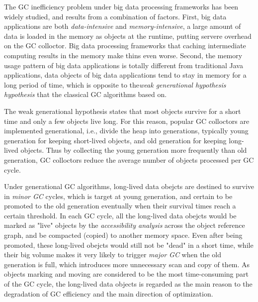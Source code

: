 \documentclass[sigplan, screen]{acmart}
\begin{document}
The GC inefficiency problem under big data processing frameworks has been widely studied\cite{xu2019experimental,bruno2018study,gidra2013study}, 
and results from a combination of factors. First, big data applications are both \emph{data-intensive} and \emph{memory-intensive}, a large amount of data 
is loaded in the memory as objects at the runtime, putting servere overhead on the GC colloctor. Big data processing frameworks that caching intermediate 
computing results in the memory make thins even worse.
 Second, the memory usage pattern of big data applications is totally different from traditional Java applications, data objects of big data applications tend to stay in memory
 for a long period of time, which is opposite to the\emph{weak generational hypothesis hypothesis}\cite{weakgenerational} that the classical GC algorithms based on.
 
The weak generational hypothesis states that most objects survive for a short time and only a few objects live long. For this reason, popular GC colloctors
are implemented generational, i.e., divide the heap into generations, typically young generation for keeping short-lived objects, and old
generation for keeping long-lived objects. Thus by collecting the young generation more frequently than old generation, GC colloctors reduce the average number of objects 
processed per GC cycle. 

Under generational GC algorithms, long-lived data obejcts are destined to survive in \emph{minor GC} cycles, which is target at young generation,
and certain to be promoted to the old generation eventually when their survival times reach a certain threshold. In each GC cycle, all the long-lived data obejcts would be marked
as "live" objects by the \emph{accessibility analysis} across the object reference graph, and be compacted (copied) to another memory space. Even after being promoted, these
long-lived obejcts would still not be "dead" in a short time, while their big volume makes it very likely to trigger \emph{major GC} when the old generation is full, 
which introduces more unnecessary scan and copy of them. 
As objects marking and moving are considered to be the most time-consuming part of the GC cycle\cite{suo2018characterizing,yu2016performance}, the long-lived data objects is regarded
as the main reason to the degradation of GC efficiency and the main direction of optimization.
\end{document}
